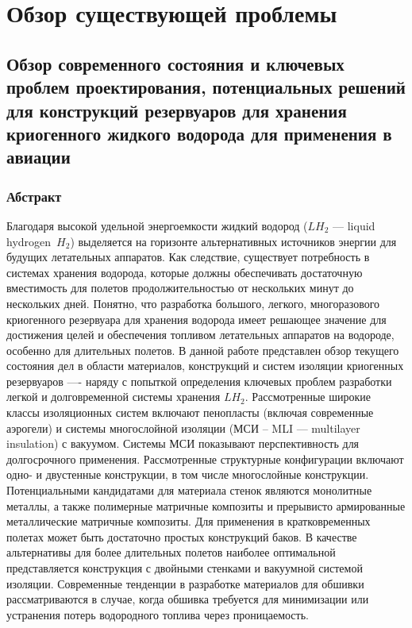 \chapter{Обзор существующей проблемы}\label{ch:overview:1}

\section{Обзор современного состояния и ключевых проблем проектирования, потенциальных решений для конструкций резервуаров для хранения криогенного жидкого водорода для применения в авиации}\label{ch:overview:1:sec1}

\subsection{Абстракт}\label{ch:overview:1:sec1:sub1}

Благодаря высокой удельной энергоемкости жидкий водород (\(LH_2\) --- liquid hydrogen~\(H_2\)) выделяется на горизонте альтернативных источников энергии для будущих летательных аппаратов. Как следствие, существует потребность в системах хранения водорода, которые должны обеспечивать достаточную вместимость для полетов продолжительностью от нескольких минут до нескольких дней. Понятно, что разработка большого, легкого, многоразового криогенного резервуара для хранения водорода имеет решающее значение для достижения целей и обеспечения топливом летательных аппаратов на водороде, особенно для длительных полетов. В данной работе  представлен обзор текущего состояния дел в области материалов, конструкций и систем изоляции криогенных резервуаров ---- наряду с попыткой определения ключевых проблем  разработки легкой и долговременной системы хранения \(LH_2\). Рассмотренные широкие классы изоляционных систем включают пенопласты (включая современные аэрогели) и системы многослойной изоляции (МСИ -- MLI --- multilayer insulation) с вакуумом. Системы МСИ показывают перспективность для долгосрочного применения. Рассмотренные структурные конфигурации включают одно- и двустенные конструкции, в том числе многослойные конструкции. Потенциальными кандидатами для материала стенок являются монолитные металлы, а также полимерные матричные композиты и прерывисто армированные металлические матричные композиты. Для применения в кратковременных полетах может быть достаточно простых конструкций баков. В качестве альтернативы для более длительных полетов наиболее оптимальной представляется конструкция с двойными стенками и вакуумной системой изоляции. Современные тенденции в разработке материалов для обшивки рассматриваются в случае, когда обшивка требуется для минимизации или устранения потерь водородного топлива через проницаемость.


